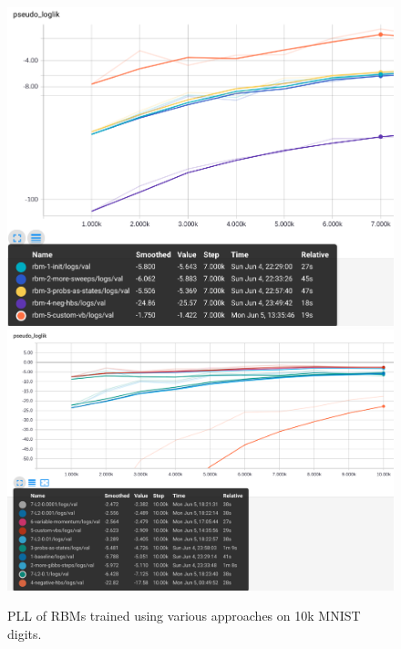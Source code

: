 \clearpage

\begin{figure}[h]
\begin{mdframed}
\centering
\includegraphics[width=4.8in]{rbm-mnist/rbm-runs_10k.png}
\\[2em]
\includegraphics[width=4.8in]{rbm-mnist/rbm_practical_10k.png}
\caption{PLL of RBMs trained using various approaches on 10k MNIST digits.}
\end{mdframed}
\end{figure}

\clearpage

